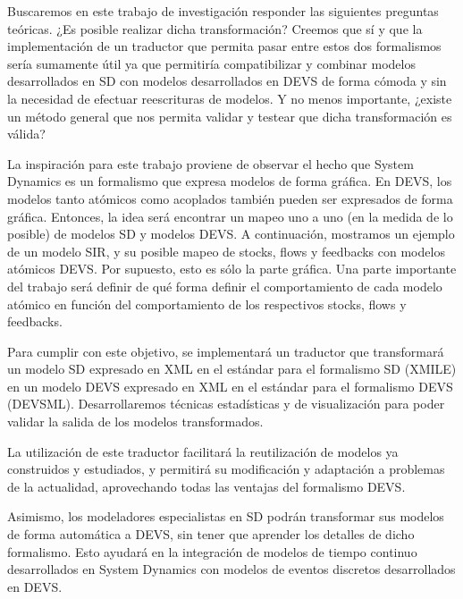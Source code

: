 Buscaremos en este trabajo de investigación responder las siguientes preguntas teóricas.
¿Es posible realizar dicha transformación? Creemos que sí y que la implementación de un traductor que permita pasar entre estos dos formalismos sería sumamente útil ya que permitiría compatibilizar y combinar modelos desarrollados en SD con modelos desarrollados en DEVS de forma cómoda y sin la necesidad de efectuar reescrituras de modelos.
Y no menos importante, ¿existe un método general que nos permita validar y testear que dicha transformación es válida?

La inspiración para este trabajo proviene de observar el hecho que System Dynamics es un formalismo que expresa modelos de forma gráfica. En DEVS, los modelos tanto atómicos como acoplados también pueden ser expresados de forma gráfica. Entonces, la idea será encontrar un mapeo uno a uno (en la medida de lo posible) de modelos SD y modelos DEVS. A continuación, mostramos un ejemplo de un modelo SIR, y su posible mapeo de stocks, flows y feedbacks con modelos atómicos DEVS. Por supuesto, esto es sólo la parte gráfica. Una parte importante del trabajo será definir de qué forma definir el comportamiento de cada modelo atómico en función del comportamiento de los respectivos stocks, flows y feedbacks.

Para cumplir con este objetivo, se implementará un traductor que transformará un modelo SD expresado en XML en el estándar para el formalismo SD (XMILE) en un modelo DEVS expresado en XML en el estándar para el formalismo DEVS (DEVSML).
Desarrollaremos técnicas estadísticas y de visualización para poder validar la salida de los modelos transformados.

La utilización de este traductor facilitará la reutilización de modelos ya construidos y estudiados, y permitirá su modificación y adaptación a problemas de la actualidad, aprovechando todas las ventajas del formalismo DEVS.

Asimismo, los modeladores especialistas en SD podrán transformar sus modelos de forma automática a DEVS, sin tener que aprender los detalles de dicho formalismo. Esto ayudará en la integración de modelos de tiempo continuo desarrollados en System Dynamics con modelos de eventos discretos desarrollados en DEVS.



